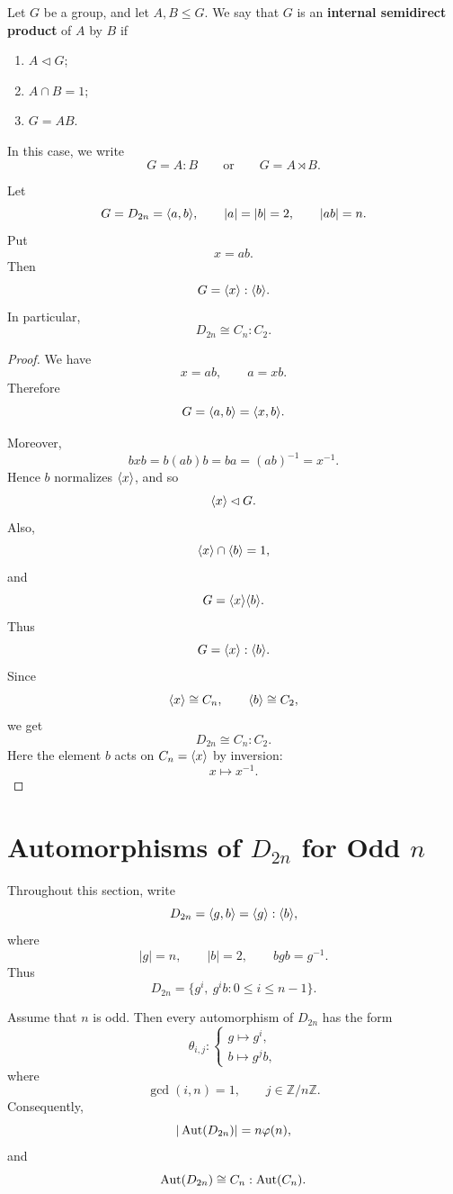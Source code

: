 \begin{definition}
Let $G$ be a group, and let $A,B\leq G$. We say that $G$ is an \textbf{internal semidirect product} of $A$ by $B$ if
\begin{enumerate}[label=(\arabic*)]
    \item $A\lhd G$;
    \item $A\cap B=1$;
    \item $G=AB$.
\end{enumerate}
In this case, we write
\[
    G=A:B
    \qquad\text{or}\qquad
    G=A\rtimes B.
\]
\end{definition}

\begin{proposition}
Let
\[
    G=D_{2n}=\langle a,b\rangle,
    \qquad
    |a|=|b|=2,
    \qquad
    |ab|=n.
\]
Put
\[
    x=ab.
\]
Then
\[
    G=\langle x\rangle:\langle b\rangle.
\]
In particular,
\[
    D_{2n}\cong C_n:C_2.
\]
\end{proposition}

\begin{proof}
We have
\[
    x=ab,
    \qquad
    a=xb.
\]
Therefore
\[
    G=\langle a,b\rangle=\langle x,b\rangle.
\]

Moreover,
\[
    bxb
    =
    b(ab)b
    =
    ba
    =
    (ab)^{-1}
    =
    x^{-1}.
\]
Hence $b$ normalizes $\langle x\rangle$, and so
\[
    \langle x\rangle\lhd G.
\]
Also,
\[
    \langle x\rangle\cap\langle b\rangle=1,
\]
and
\[
    G=\langle x\rangle\langle b\rangle.
\]
Thus
\[
    G=\langle x\rangle:\langle b\rangle.
\]
Since
\[
    \langle x\rangle\cong C_n,
    \qquad
    \langle b\rangle\cong C_2,
\]
we get
\[
    D_{2n}\cong C_n:C_2.
\]
Here the element $b$ acts on $C_n=\langle x\rangle$ by inversion:
\[
    x\longmapsto x^{-1}.
\]
\end{proof}

\section{Automorphisms of \texorpdfstring{$D_{2n}$}{D2n} for Odd \texorpdfstring{$n$}{n}}

Throughout this section, write
\[
    D_{2n}
    =
    \langle g,b\rangle
    =
    \langle g\rangle:\langle b\rangle,
\]
where
\[
    |g|=n,
    \qquad
    |b|=2,
    \qquad
    bgb=g^{-1}.
\]
Thus
\[
    D_{2n}
    =
    \{g^i,\ g^i b:0\leq i\leq n-1\}.
\]

\begin{theorem}
Assume that $n$ is odd. Then every automorphism of $D_{2n}$ has the form
\[
    \theta_{i,j}:
    \begin{cases}
        g\longmapsto g^i,\\
        b\longmapsto g^j b,
    \end{cases}
\]
where
\[
    \gcd(i,n)=1,
    \qquad
    j\in\mathbb Z/n\mathbb Z.
\]
Consequently,
\[
    |\operatorname{Aut}(D_{2n})|=n\varphi(n),
\]
and
\[
    \operatorname{Aut}(D_{2n})
    \cong
    C_n:\operatorname{Aut}(C_n).
\]
\end{theorem}

